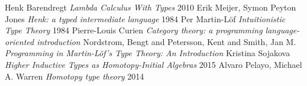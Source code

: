 \documentclass[11pt,oneside]{article}
\begin{document}
\begin{thebibliography}{9}

      Henk Barendregt \textit{Lambda Calculus With Types} 2010
       Erik Meijer, Symon Peyton Jones \textit{Henk: a typed intermediate language} 1984
        Per Martin-Löf \textit{Intuitionistic Type Theory} 1984
    Pierre-Louis Curien \textit{Category theory: a programming language-oriented introduction}
 Nordstrom, Bengt and Petersson, Kent and Smith, Jan M. \textit{Programming in Martin-L\"{o}f's Type Theory: An Introduction}
 Kristina Sojakova \textit{Higher Inductive Types as Homotopy-Initial Algebras} 2015
 Alvaro Pelayo, Michael A. Warren \textit{Homotopy type theory} 2014




\end{thebibliography}
\end{document}
